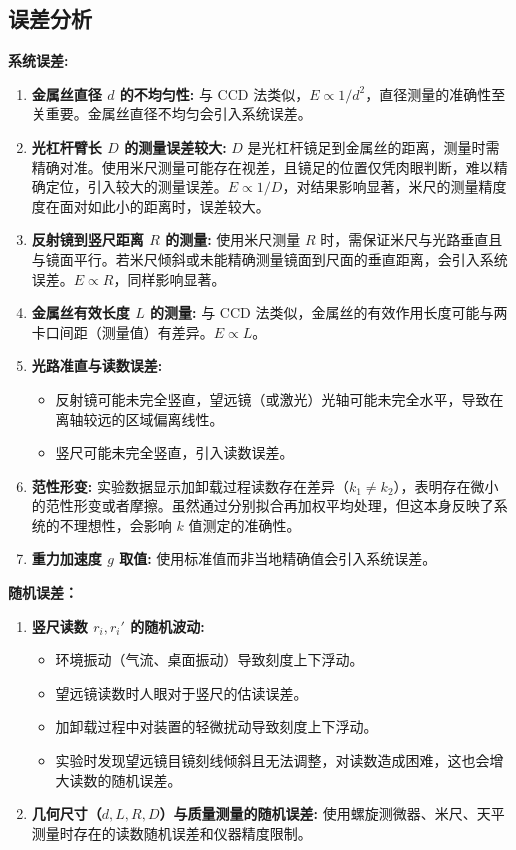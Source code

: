 \documentclass[12pt]{article}
\begin{document}
\subsection{误差分析}
\textbf{系统误差:}
\begin{enumerate}
    \item \textbf{金属丝直径 $d$ 的不均匀性:} 与 CCD 法类似，$E \propto 1/d^2$，直径测量的准确性至关重要。金属丝直径不均匀会引入系统误差。
    \item \textbf{光杠杆臂长 $D$ 的测量误差较大:} $D$ 是光杠杆镜足到金属丝的距离，测量时需精确对准。使用米尺测量可能存在视差，且镜足的位置仅凭肉眼判断，难以精确定位，引入较大的测量误差。$E \propto 1/D$，对结果影响显著，米尺的测量精度度在面对如此小的距离时，误差较大。
    \item \textbf{反射镜到竖尺距离 $R$ 的测量:} 使用米尺测量 $R$ 时，需保证米尺与光路垂直且与镜面平行。若米尺倾斜或未能精确测量镜面到尺面的垂直距离，会引入系统误差。$E \propto R$，同样影响显著。
    \item \textbf{金属丝有效长度 $L$ 的测量:} 与 CCD 法类似，金属丝的有效作用长度可能与两卡口间距（测量值）有差异。$E \propto L$。
    \item \textbf{光路准直与读数误差:}
        \begin{itemize}
            \item 反射镜可能未完全竖直，望远镜（或激光）光轴可能未完全水平，导致在离轴较远的区域偏离线性。
            \item 竖尺可能未完全竖直，引入读数误差。
        \end{itemize}
    \item \textbf{范性形变:} 实验数据显示加卸载过程读数存在差异（$k_1 \neq k_2$），表明存在微小的范性形变或者摩擦。虽然通过分别拟合再加权平均处理，但这本身反映了系统的不理想性，会影响 $k$ 值测定的准确性。
    \item \textbf{重力加速度 $g$ 取值:} 使用标准值而非当地精确值会引入系统误差。
\end{enumerate}
\textbf{随机误差：}
\begin{enumerate}
    \item \textbf{竖尺读数 $r_i, r_i'$ 的随机波动:}
        \begin{itemize}
            \item 环境振动（气流、桌面振动）导致刻度上下浮动。
            \item 望远镜读数时人眼对于竖尺的估读误差。
            \item 加卸载过程中对装置的轻微扰动导致刻度上下浮动。
            \item 实验时发现望远镜目镜刻线倾斜且无法调整，对读数造成困难，这也会增大读数的随机误差。
        \end{itemize}
    \item \textbf{几何尺寸（$d, L, R, D$）与质量测量的随机误差:} 使用螺旋测微器、米尺、天平测量时存在的读数随机误差和仪器精度限制。
\end{enumerate}
\end{document}
